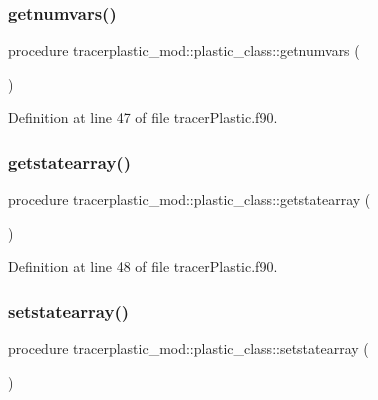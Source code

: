 \subsubsection{\texorpdfstring{getnumvars()}{getnumvars()}}
{\footnotesize\ttfamily procedure tracerplastic\+\_\+mod\+::plastic\+\_\+class\+::getnumvars (\begin{DoxyParamCaption}{ }\end{DoxyParamCaption})\hspace{0.3cm}{\ttfamily [private]}}



Definition at line 47 of file tracer\+Plastic.\+f90.

\mbox{\label{structtracerplastic__mod_1_1plastic__class_a633bfd965f7964ca5d8fd9fdb7c3e2d0}} 
\subsubsection{\texorpdfstring{getstatearray()}{getstatearray()}}
{\footnotesize\ttfamily procedure tracerplastic\+\_\+mod\+::plastic\+\_\+class\+::getstatearray (\begin{DoxyParamCaption}{ }\end{DoxyParamCaption})\hspace{0.3cm}{\ttfamily [private]}}



Definition at line 48 of file tracer\+Plastic.\+f90.

\mbox{\label{structtracerplastic__mod_1_1plastic__class_ae42b613c9b924bc54f278c1361ca59e3}} 
\subsubsection{\texorpdfstring{setstatearray()}{setstatearray()}}
{\footnotesize\ttfamily procedure tracerplastic\+\_\+mod\+::plastic\+\_\+class\+::setstatearray (\begin{DoxyParamCaption}{ }\end{DoxyParamCaption})\hspace{0.3cm}{\ttfamily [private]}}



